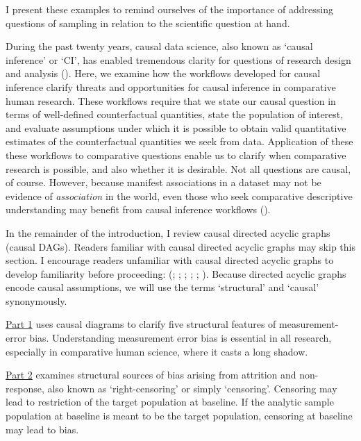 \documentclass[
  single column]{article}
\begin{document}
I present these examples to remind ourselves of the importance of
addressing questions of sampling in relation to the scientific question
at hand.

During the past twenty years, causal data science, also known as `causal
inference' or `CI', has enabled tremendous clarity for questions of
research design and analysis
().
Here, we examine how the workflows developed for causal inference
clarify threats and opportunities for causal inference in comparative
human research. These workflows require that we state our causal
question in terms of well-defined counterfactual quantities, state the
population of interest, and evaluate assumptions under which it is
possible to obtain valid quantitative estimates of the counterfactual
quantities we seek from data. Application of these these workflows to
comparative questions enable us to clarify when comparative research is
possible, and also whether it is desirable. Not all questions are
causal, of course. However, because manifest associations in a dataset
may not be evidence of \emph{association} in the world, even those who
seek comparative descriptive understanding may benefit from causal
inference workflows ().

In the remainder of the introduction, I review causal directed acyclic
graphs (causal DAGs). Readers familiar with causal directed acyclic
graphs may skip this section. I encourage readers unfamiliar with causal
directed acyclic graphs to develop familiarity before proceeding:
(;
;
;
;
;
). Because directed acyclic graphs
encode causal assumptions, we will use the terms `structural' and
`causal' synonymously.

\hyperref[id-sec-1]{Part 1} uses causal diagrams to clarify five
structural features of measurement-error bias. Understanding measurement
error bias is essential in all research, especially in comparative human
science, where it casts a long shadow.

\hyperref[id-sec-2]{Part 2} examines structural sources of bias arising
from attrition and non-response, also known as `right-censoring' or
simply `censoring'. Censoring may lead to restriction of the target
population at baseline. If the analytic sample population at baseline is
meant to be the target population, censoring at baseline may lead to
bias.
\end{document}

